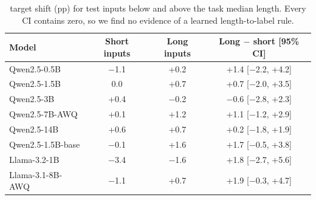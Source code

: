 \begin{table}[h]
    \centering
    \small
    \begin{tabular}{@{}lccc@{}}
        \toprule
        \textbf{Model} & \textbf{Short inputs} & \textbf{Long inputs} & \textbf{Long $-$ short [95\% CI]} \\
        \midrule
        Qwen2.5-0.5B      & $-$1.1 & +0.2 & +1.4 [$-$2.2, +4.2] \\
        Qwen2.5-1.5B      & 0.0 & +0.7 & +0.7 [$-$2.0, +3.5] \\
        Qwen2.5-3B        & +0.4 & $-$0.2 & $-$0.6 [$-$2.8, +2.3] \\
        Qwen2.5-7B-AWQ    & +0.1 & +1.2 & +1.1 [$-$1.2, +2.9] \\
        Qwen2.5-14B       & +0.6 & +0.7 & +0.2 [$-$1.8, +1.9] \\
        Qwen2.5-1.5B-base & $-$0.1 & +1.6 & +1.7 [$-$0.5, +3.8] \\
        Llama-3.2-1B      & $-$3.4 & $-$1.6 & +1.8 [$-$2.7, +5.6] \\
        Llama-3.1-8B-AWQ  & $-$1.1 & +0.7 & +1.9 [$-$0.3, +4.7] \\
        \bottomrule
    \end{tabular}
    \caption{\lengthc target shift (pp) for test inputs below and above the task median length. Every CI contains zero, so we find no evidence of a learned length-to-label rule.}
    \label{tab:lenint}
\end{table}
